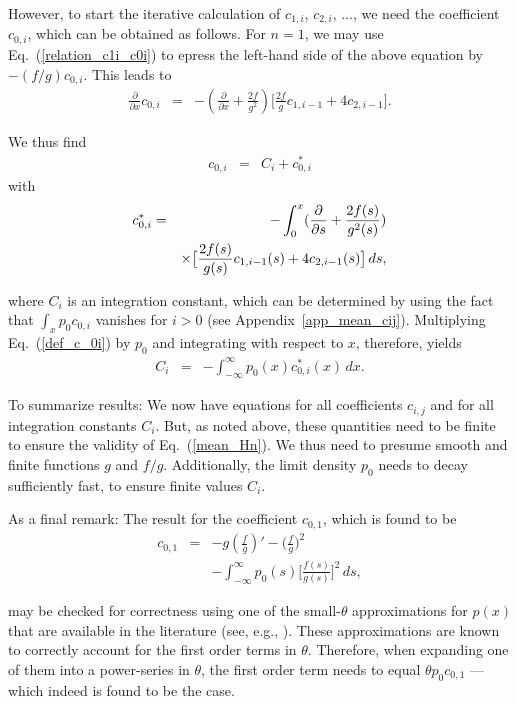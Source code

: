 \documentclass[aps,twocolumn,superscriptaddress,showpacs,showkeys]{revtex4}
\newcommand{\p}{\partial}
\begin{document}
{\noindent However, to start the iterative calculation of $c_{1,i}$, $c_{2,i}$, $\ldots$, we need the coefficient $c_{0,i}$,
which can be obtained as follows. For $n=1$, we may use Eq.~(\ref{relation_c1i_c0i}) to epress the left-hand side of the above
equation by $-(f/g)c_{0,i}$. This leads to
%
\begin{eqnarray}
\frac{\p}{\p x}c_{0,i} &=& -(\frac{\p}{\p x}+\frac{2f}{g^2})\big[\frac{2f}{g}c_{1,i-1} +4c_{2,i-1}\big].
\end{eqnarray}

\noindent We thus find
%
\begin{eqnarray}\label{def_c_0i}
c_{0,i} &=& C_i+c^*_{0,i}
\end{eqnarray}
%
\noindent with
%
\begin{eqnarray}
c^*_{0,i} &=& -\int_0^x(\frac{\p}{\p s}+\frac{2f(s)}{g^2(s)})\cr
&&\times\big[\frac{2f(s)}{g(s)}c_{1,i-1}(s) +4c_{2,i-1}(s)\big]\,ds,
\end{eqnarray}

\noindent where $C_i$ is an integration constant, which can be determined by using the fact that
$\int_xp_0c_{0,i}$ vanishes for $i>0$ (see Appendix~\ref{app_mean_cij}). Multiplying Eq.~(\ref{def_c_0i}) by $p_0$
and integrating with respect to $x$, therefore, yields
%
\begin{eqnarray}
C_i &=& -\int_{-\infty}^\infty p_0(x)c^*_{0,i}(x)\,dx.
\end{eqnarray}

\noindent To summarize results: We now have equations for all coefficients $c_{i,j}$ and for all integration constants
$C_i$. But, as noted above, these quantities need to be finite to ensure the validity of Eq.~(\ref{mean_Hn}).
We thus need to presume smooth and finite functions $g$ and $f/g$. Additionally, the limit density $p_0$ needs to decay
sufficiently fast, to ensure finite values $C_i$.

As a final remark: The result for the coefficient $c_{0,1}$, which is found to be
%
\begin{eqnarray}
c_{0,1} &=&  -g\left(\frac{f}{g}\right)'-\Big(\frac{f}{g}\Big)^2\nonumber\\
        &&   -\int_{-\infty\!}^\infty p_0(s) \Big[\frac{f(s)}{g(s)}\Big]^2\,ds,
\end{eqnarray}

\noindent may be checked for correctness using one of the small-$\theta$ approximations for $p(x)$ that are available in the
literature (see, e.g., \cite{haenggi95}). These approximations are known to correctly account for the first order
terms in $\theta$. Therefore, when expanding one of them into a power-series in $\theta$, the first order term needs
to equal $\theta p_0c_{0,1}$ --- which indeed is found to be the case.


}
\end{document}
